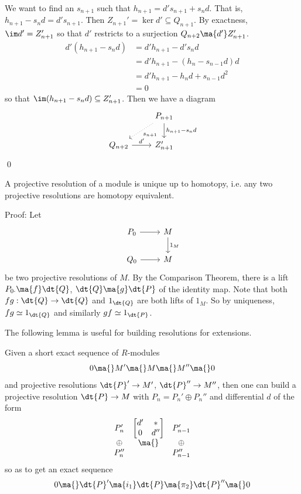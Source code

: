 We want to find an $s_{n+1}$ such that $h_{n+1}=d's_{n+1} + s_nd$. That is, $h_{n+1}-s_nd=d's_{n+1}$. Then $Z_{n+1}' =\ker d' \subseteq Q_{n+1}$. By exactness, $\im d' =Z_{n+1}'$ so that $d'$ restricts to a surjection $Q_{n+2} \ma{d'} Z_{n+1}'$. 
\[
\begin{split}
d'(h_{n+1}-s_nd) &=d'h_{n+1}-d's_nd \\
&=d'h_{n+1}-(h_n-s_{n-1}d)d \\
&=d'h_{n+1}-h_nd+s_{n-1}d^2 \\
&=0
\end{split}
\]
so that $\im(h_{n+1}-s_nd) \subseteq Z_{n+1}'$. Then we have a diagram
\[
\begin{tikzcd}
\phantom{x} & P_{n+1} \arrow[dotted]{dl}{s_{n+1}} \arrow{d}{h_{n+1}-s_nd} \\
Q_{n+2} \arrow{r}{d'} & Z_{n+1}'
\end{tikzcd}
\]
\qed \\

\begin{cor}
A projective resolution of a module is unique up to homotopy, i.e. any two projective resolutions are homotopy equivalent. 
\end{cor}

Proof: Let
\[
\begin{tikzcd}
P_0 \arrow{r} & M \arrow{d}{1_M} \\
Q_0 \arrow{r} & M 
\end{tikzcd}
\]
be two projective resolutions of $M$. By the Comparison Theorem, there is a lift $P_{0\cdot} \ma{f} \dt{Q}$, $\dt{Q} \ma{g} \dt{P}$ of the identity map. Note that both $fg: \dt{Q} \to \dt{Q}$ and $1_{\dt{Q}}$ are both lifts of $1_M$. So by uniqueness, $fg \simeq 1_{\dt{Q}}$ and similarly $gf \simeq 1_{\dt{P}}$. 

The following lemma is useful for building resolutions for extensions.

\begin{lem}
Given a short exact sequence of $R$-modules
\[
0 \ma{} M' \ma{} M \ma{} M'' \ma{} 0
\]
and projective resolutions $\dt{P}' \to M'$, $\dt{P}'' \to M''$, then one can build a projective resolution $\dt{P} \to M$ with $P_n= P_n' \oplus P_n''$ and differential $d$ of the form
\[
\begin{matrix}
P_n' & \begin{bmatrix} d' & * \\ 0 & d'' \end{bmatrix} & P_{n-1}' \\
\oplus & \ma{} & \oplus \\
P_n'' & & P_{n-1}''
\end{matrix}
\]
so as to get an exact sequence
\[
0 \ma{} \dt{P}' \ma{i_1} \dt{P} \ma{\pi_2} \dt{P}'' \ma{} 0
\] 
\end{lem}

